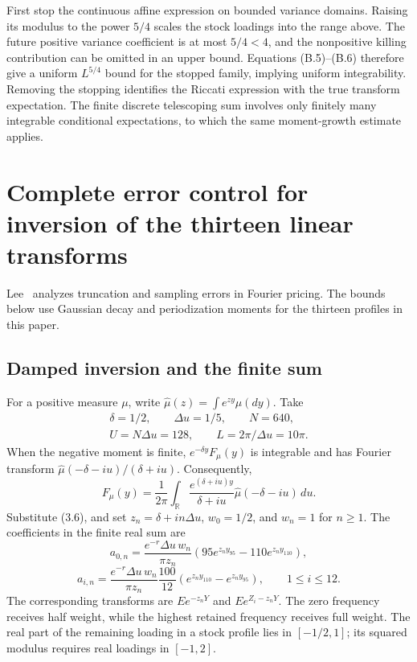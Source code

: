 \documentclass[11pt,a4paper]{article}
\begin{document}
First stop the continuous affine expression on bounded variance domains. Raising its modulus to the power \(5/4\) scales the stock loadings into the range above. The future positive variance coefficient is at most \(5/4<4\), and the nonpositive killing contribution can be omitted in an upper bound. Equations (B.5)--(B.6) therefore give a uniform \(L^{5/4}\) bound for the stopped family, implying uniform integrability. Removing the stopping identifies the Riccati expression with the true transform expectation. The finite discrete telescoping sum involves only finitely many integrable conditional expectations, to which the same moment-growth estimate applies.

\section{Complete error control for inversion of the thirteen linear transforms}

Lee~\cite{Lee2004} analyzes truncation and sampling errors in Fourier pricing. The bounds below use Gaussian decay and periodization moments for the thirteen profiles in this paper.

\subsection{Damped inversion and the finite sum}

For a positive measure \(\mu\), write \(\widehat\mu(z)=\int e^{zy}\mu(dy)\). Take
\[
\begin{gathered}
\delta=1/2,\qquad \Delta u=1/5,\qquad N=640,\\
U=N\Delta u=128,\qquad L=2\pi/\Delta u=10\pi.
\end{gathered}
\]
When the negative moment is finite, \(e^{-\delta y}F_\mu(y)\) is integrable and has Fourier transform \(\widehat\mu(-\delta-iu)/(\delta+iu)\). Consequently,
\[
F_\mu(y)=\frac1{2\pi}\int_{\mathbb R}
\frac{e^{(\delta+iu)y}}{\delta+iu}\widehat\mu(-\delta-iu)\,du.
\tag{C.1}
\]
Substitute (3.6), and set \(z_n=\delta+in\Delta u\), \(w_0=1/2\), and \(w_n=1\) for \(n\ge1\). The coefficients in the finite real sum are
\[
a_{0,n}=\frac{e^{-r}\Delta u\,w_n}{\pi z_n}
\left(95e^{z_ny_{95}}-110e^{z_ny_{110}}\right),
\]
\[
a_{i,n}=\frac{e^{-r}\Delta u\,w_n}{\pi z_n}\frac{100}{12}
\left(e^{z_ny_{110}}-e^{z_ny_{95}}\right),\qquad 1\le i\le12.
\tag{C.2}
\]
The corresponding transforms are \(Ee^{-z_nY}\) and \(Ee^{Z_i-z_nY}\). The zero frequency receives half weight, while the highest retained frequency receives full weight. The real part of the remaining loading in a stock profile lies in \([-1/2,1]\); its squared modulus requires real loadings in \([-1,2]\).
\end{document}
